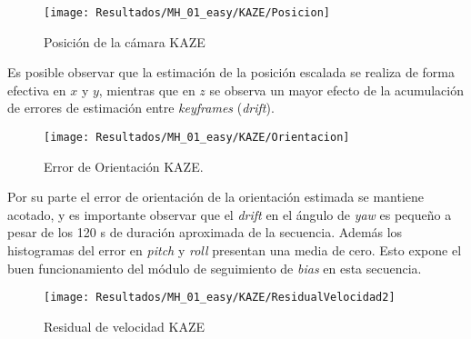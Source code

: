 \begin{figure}[H]
	\centering
	\texttt{[image: Resultados/MH\_01\_easy/KAZE/Posicion]}
	\caption{Posición de la cámara KAZE}
	\label{imagen:Resultados/MH_01_easy/KAZE/Posicion}
\end{figure}

Es posible observar que la estimación de la posición escalada se realiza de forma efectiva  en $x$ y $y$, mientras que en $z$ se observa un mayor efecto de la acumulación de errores de estimación entre \textit{keyframes} (\textit{drift}).


\begin{figure}[H]
	\centering
	\texttt{[image: Resultados/MH\_01\_easy/KAZE/Orientacion]}
	\caption[Error de Orientación KAZE]{Error de Orientación KAZE.}
	\label{imagen:Resultados/MH_01_easy/KAZE/Orientacion}
\end{figure}

Por su parte el error de orientación de la orientación estimada se mantiene acotado, y es importante observar que el \textit{drift} en el ángulo de \textit{yaw} es pequeño a pesar de los 120 s de duración aproximada de la secuencia. Además los histogramas del error en \textit{pitch} y \textit{roll} presentan una media de cero. Esto expone el buen funcionamiento del módulo de seguimiento de \textit{bias} en esta secuencia. 

\begin{figure}[H]
	\centering
	\texttt{[image: Resultados/MH\_01\_easy/KAZE/ResidualVelocidad2]}
	\caption{Residual de velocidad KAZE}
	\label{imagen:Resultados/MH_01_easy/KAZE/ResidualVelocidad}
\end{figure}

%
%
%
%
%
%
%
%

